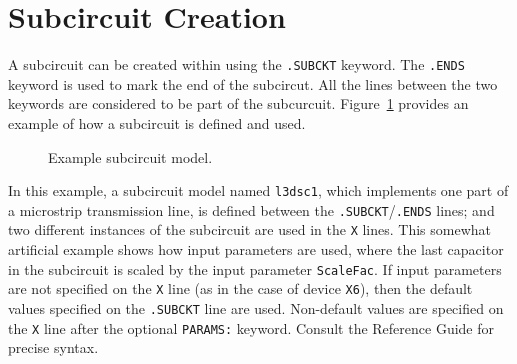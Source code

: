 \clearpage
\section{Subcircuit Creation}
\label{Subcircuit_Sect}

A subcircuit can be created within \Xyce{} using the \texttt{.SUBCKT} keyword.
The \texttt{.ENDS} keyword is used to mark the end of the subcircut. All the
lines between the two keywords are considered to be part of the subcurcuit.  
Figure~\ref{Subcircuit_Example} provides an example of how a subcircuit is
defined and used.

\begin{figure}[H]
\begin{centering}
\caption{Example subcircuit model.\label{Subcircuit_Example}}
\end{centering}
\end{figure}

In this example, a subcircuit model named \texttt{l3dsc1}, which implements one
part of a microstrip transmission line, is defined between the
\texttt{.SUBCKT}/\texttt{.ENDS} lines; and two different instances of the
subcircuit are used in the \texttt{X} lines.  This somewhat artificial example
shows how input parameters are used, where the last capacitor in the subcircuit
is scaled by the input parameter \texttt{ScaleFac}.  If input parameters are
not specified on the \texttt{X} line (as in the case of device \texttt{X6}),
then the default values specified on the \texttt{.SUBCKT} line are used.
Non-default values are specified on the \texttt{X} line after the optional
\texttt{PARAMS:} keyword.  Consult the \Xyce{} Reference Guide\ReferenceGuide{}
for precise syntax.

